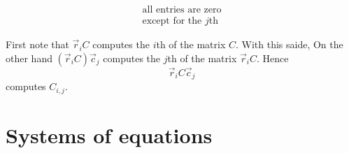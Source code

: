 \documentclass{ximera}
\begin{document}
\begin{example}
\begin{itemize}
\[\begin{matrix}
        \text{all entries are zero}\\
        \text{except for the $j$th}
      \end{matrix}
      \]
  \end{itemize}
  \begin{explanation}
    First note that $\vec r_i C$ computes the $i$th
     of the matrix
    $C$. With this saide, On the other hand $(\vec r_i C)\vec c_j$ computes the $j$th
     of the matrix
    $\vec r_i C$. Hence
    \[
    \vec r_i C\vec{c}_j
    \]
    computes $C_{i,j}$.
  \end{explanation}
\end{example}





\section{Systems of equations}
\end{document}
